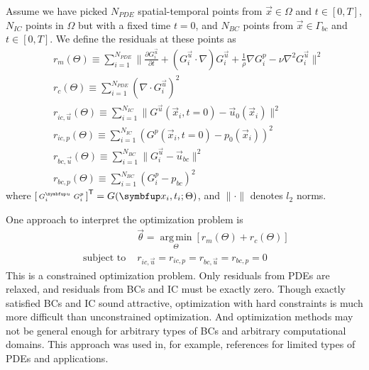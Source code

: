 Assume we have picked $N_{PDE}$ spatial-temporal points from $\vec{x}\in\Omega$ and $t\in[0, T]$, $N_{IC}$ points in $\Omega$ but with a fixed time $t=0$, and $N_{BC}$ points from $\vec{x} \in \Gamma_{bc}$ and $t\in[0, T]$.
We define the residuals at these points as \\
\begin{equation}\label{eq:residual-norms}
    \begin{aligned}
        & r_{m}(\Theta) \equiv \sum\limits_{i=1}^{N_{PDE}} \lVert\frac{\partial G_i^{\vec{u}}}{\partial t}+(G_i^{\vec{u}} \cdot \nabla) G_i^{\vec{u}}+\frac{1}{\rho} \nabla G_i^p -\nu \nabla^{2} G_i^{\vec{u}} \rVert^2 \\
        & r_{c}(\Theta) \equiv \sum\limits_{i=1}^{N_{PDE}} ( \nabla \cdot G_i^{\vec{u}} )^2 \\
        & r_{ic,\vec{u}}(\Theta) \equiv \sum\limits_{i=1}^{N_{IC}} \lVert G^{\vec{u}}(\vec{x}_i, t=0)-\vec{u}_0(\vec{x}_i) \rVert^2 \\
        & r_{ic,p}(\Theta) \equiv \sum\limits_{i=1}^{N_{IC}} ( G^{p}(\vec{x}_i, t=0)-p_0(\vec{x}_i) )^2 \\
        & r_{bc,\vec{u}}(\Theta) \equiv \sum\limits_{i=1}^{N_{BC}} \lVert G_i^{\vec{u}}-\vec{u}_{bc} \rVert^2 \\
        & r_{bc,p}(\Theta) \equiv \sum\limits_{i=1}^{N_{BC}} ( G_i^{p}-p_{bc} )^2
   \end{aligned}
\end{equation}
where $\begin{bsmallmatrix}G_i^{\vec{u}} & G_i^p\end{bsmallmatrix}^\mathsf{T} = G(\vec{x}_i, t_i; \Theta)$, and $\lVert\cdot\rVert$ denotes $l_2$ norms.

One approach to interpret the optimization problem is
\begin{equation}\label{eq:hard-constraint-loss}
    \begin{aligned}
    &\vec{\theta} = \operatorname*{arg\,min}\limits_{\Theta} \left[r_m(\Theta) + r_c(\Theta)\right] \\
    \text{ subject to } &r_{ic,\vec{u}}=r_{ic,p}=r_{bc,\vec{u}}=r_{bc,p}=0
    \end{aligned}
\end{equation}
This is a constrained optimization problem.
Only residuals from PDEs are relaxed, and residuals from BCs and IC must be exactly zero.
Though exactly satisfied BCs and IC sound attractive, optimization with hard constraints is much more difficult than unconstrained optimization.
And optimization methods may not be general enough for arbitrary types of BCs and arbitrary computational domains.
This approach was used in, for example, references \cite{lagaris_artificial_1998,McFall2009,mcfall_solving_2010,berg_unified_2018} for limited types of PDEs and applications.

